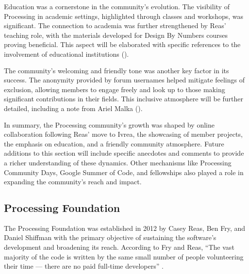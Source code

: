Education was a cornerstone in the community's evolution. The visibility of Processing in academic settings, highlighted through classes and workshops, was significant. The connection to academia was further strengthened by Reas' teaching role, with the materials developed for Design By Numbers courses proving beneficial. This aspect will be elaborated with specific references to the involvement of educational institutions ().

The community's welcoming and friendly tone was another key factor in its success. The anonymity provided by forum usernames helped mitigate feelings of exclusion, allowing members to engage freely and look up to those making significant contributions in their fields. This inclusive atmosphere will be further detailed, including a note from Ariel Malka ().

In summary, the Processing community's growth was shaped by online collaboration following Reas' move to Ivrea, the showcasing of member projects, the emphasis on education, and a friendly community atmosphere. Future additions to this section will include specific anecdotes and comments to provide a richer understanding of these dynamics. Other mechanisms like Processing Community Days, Google Summer of Code, and fellowships also played a role in expanding the community's reach and impact.

\subsection{Processing Foundation}

The Processing Foundation was established in 2012 by Casey Reas, Ben Fry, and Daniel Shiffman with the primary objective of sustaining the software's development and broadening its reach. According to Fry and Reas, ``The vast majority of the code is written by the same small number of people volunteering their time — there are no paid full-time developers'' \parencite[p.~13]{fryModernPrometheusHistory2018}.

